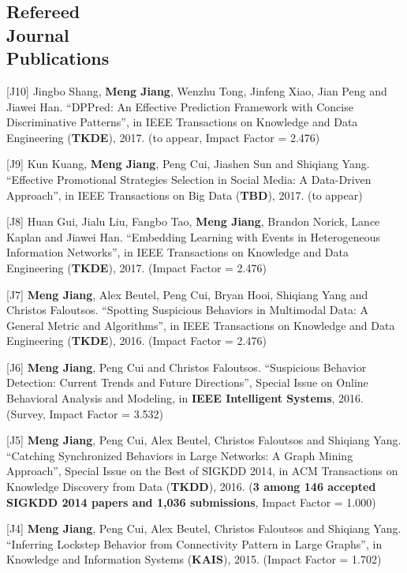 \documentclass[margin, 9pt]{res}
\begin{document}
\begin{resume}

\section{Refereed \\ Journal \\ Publications}

[J10] Jingbo Shang, \textbf{Meng Jiang}, Wenzhu Tong, Jinfeng Xiao, Jian Peng and Jiawei Han. ``DPPred: An Effective Prediction Framework with Concise Discriminative Patterns'', in IEEE Transactions on Knowledge and Data Engineering (\textbf{TKDE}), 2017. (to appear, Impact Factor = 2.476)

[J9] Kun Kuang, \textbf{Meng Jiang}, Peng Cui, Jiashen Sun and Shiqiang Yang. ``Effective Promotional Strategies Selection in Social Media: A Data-Driven Approach'', in IEEE Transactions on Big Data (\textbf{TBD}), 2017. (to appear)

[J8] Huan Gui, Jialu Liu, Fangbo Tao, \textbf{Meng Jiang}, Brandon Norick, Lance Kaplan and Jiawei Han. ``Embedding Learning with Events in Heterogeneous Information Networks'', in IEEE Transactions on Knowledge and Data Engineering (\textbf{TKDE}), 2017. (Impact Factor = 2.476)

[J7] \textbf{Meng Jiang}, Alex Beutel, Peng Cui, Bryan Hooi, Shiqiang Yang and Christos Faloutsos. ``Spotting Suspicious Behaviors in Multimodal Data: A General Metric and Algorithms'', in IEEE Transactions on Knowledge and Data Engineering (\textbf{TKDE}), 2016. (Impact Factor = 2.476)

[J6] \textbf{Meng Jiang}, Peng Cui and Christos Faloutsos. ``Suspicious Behavior Detection: Current Trends and Future Directions'', Special Issue on Online Behavioral Analysis and Modeling, in \textbf{IEEE Intelligent Systems}, 2016. (Survey, Impact Factor = 3.532)

[J5] \textbf{Meng Jiang}, Peng Cui, Alex Beutel, Christos Faloutsos and Shiqiang Yang. ``Catching Synchronized Behaviors in Large Networks: A Graph Mining Approach'', Special Issue on the Best of SIGKDD 2014, in ACM Transactions on Knowledge Discovery from Data (\textbf{TKDD}), 2016. (\textbf{3 among 146 accepted SIGKDD 2014 papers and 1,036 submissions}, Impact Factor = 1.000)

[J4] \textbf{Meng Jiang}, Peng Cui, Alex Beutel, Christos Faloutsos and Shiqiang Yang. ``Inferring Lockstep Behavior from Connectivity Pattern in Large Graphs'', in Knowledge and Information Systems (\textbf{KAIS}), 2015. (Impact Factor = 1.702)


\end{resume}
\end{document}
